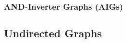 \subsubsection{AND-Inverter Graphs (AIGs)}
\label{sssec:ANDInverterGraphsAIGs}













\subsection{Undirected Graphs}
\label{ssec:UndirectedGraphs}















